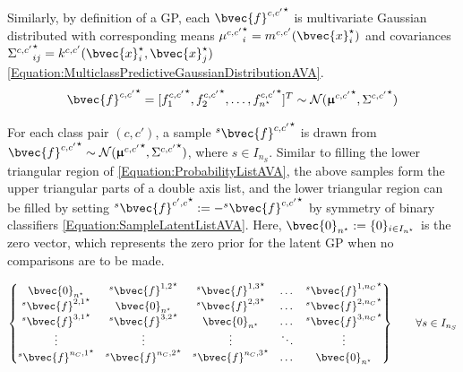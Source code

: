				Similarly, by definition of a GP, each ${\bvec{f}^{c, c'}}^{\star}$ is multivariate Gaussian distributed with corresponding means ${\mu^{c, c'}}^{\star}_{i} = m^{c, c'}(\bvec{x}^{\star}_{i})$ and covariances ${\Sigma^{c, c'}}^{\star}_{ij} = k^{c, c'}(\bvec{x}^{\star}_{i}, \bvec{x}^{\star}_{j})$ \eqref{Equation:MulticlassPredictiveGaussianDistributionAVA}. \begin{equation}
					{\bvec{f}^{c, c'}}^{\star} = [{f^{c, c'}_{1}}^{\star}, {f^{c, c'}_{2}}^{\star}, \dots, {f^{c, c'}_{n^{\star}}}^{\star}]^{T} \sim \mathcal{N}({\vec{\upmu}^{c, c'}}^{\star}, {\Sigma^{c, c'}}^{\star})
				\label{Equation:MulticlassPredictiveGaussianDistributionAVA}
				\end{equation}
				
				For each class pair $(c, c')$, a sample ${^{s}}{\bvec{f}^{c, c'}}^{\star}$ is drawn from ${\bvec{f}^{c, c'}}^{\star} \sim \mathcal{N}({\vec{\upmu}^{c, c'}}^{\star}, {\Sigma^{c, c'}}^{\star})$, where $s \in I_{n_{S}}$. Similar to filling the lower triangular region of \eqref{Equation:ProbabilityListAVA}, the above samples form the upper triangular parts of a double axis list, and the lower triangular region can be filled by setting ${^{s}}{\bvec{f}^{c', c}}^{\star} := -{^{s}}{\bvec{f}^{c, c'}}^{\star}$ by symmetry of binary classifiers \ref{Equation:SampleLatentListAVA}. Here, $\bvec{0}_{n^{\star}} := \{0\}_{i \in I_{n^{\star}}}$ is the zero vector, which represents the zero prior for the latent GP when no comparisons are to be made.
				
				\begin{equation}
					\begin{Bmatrix*}
						\bvec{0}_{n^{\star}} & {^{s}}{\bvec{f}^{1, 2}}^{\star} & {^{s}}{\bvec{f}^{1, 3}}^{\star} & \dots & {^{s}}{\bvec{f}^{1, n_{C}}}^{\star} \\
						{^{s}}{\bvec{f}^{2, 1}}^{\star} & \bvec{0}_{n^{\star}} & {^{s}}{\bvec{f}^{2, 3}}^{\star} & \dots & {^{s}}{\bvec{f}^{2, n_{C}}}^{\star} \\
						{^{s}}{\bvec{f}^{3, 1}}^{\star} & {^{s}}{\bvec{f}^{3, 2}}^{\star} & \bvec{0}_{n^{\star}} & \dots & {^{s}}{\bvec{f}^{3, n_{C}}}^{\star} \\
						\vdots & \vdots & \vdots & \ddots & \vdots \\
						{^{s}}{\bvec{f}^{n_{C}, 1}}^{\star} & {^{s}}{\bvec{f}^{n_{C}, 2}}^{\star} & {^{s}}{\bvec{f}^{n_{C}, 3}}^{\star} & \dots & \bvec{0}_{n^{\star}} 
					\end{Bmatrix*} \qquad \forall s \in I_{n_{S}}
				\label{Equation:SampleLatentListAVA}
				\end{equation}
				
